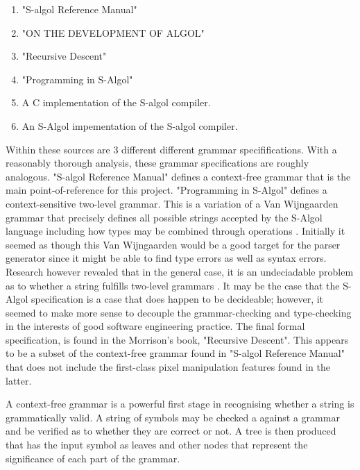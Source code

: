 \documentclass{article}
\begin{document}
\begin{enumerate}
\item "S-algol Reference Manual" \cite{TODO}
\item "ON THE DEVELOPMENT OF ALGOL" \cite{TODO}
\item "Recursive Descent" \cite{TODO}
\item "Programming in S-Algol" \cite{TODO}
\item A C implementation of the S-algol compiler. 
\item An S-Algol impementation of the S-algol compiler. 
\end{enumerate}

Within these sources are 3 different different grammar specififications. With a reasonably thorough analysis, these grammar specifications are roughly analogous. "S-algol Reference Manual" defines a context-free grammar that is the main point-of-reference for this project. "Programming in S-Algol" defines a context-sensitive two-level grammar. This is a variation of a Van Wijngaarden grammar that precisely defines all possible strings accepted by the S-Algol language including how types may be combined through operations \cite{TODO}. Initially it seemed as though this Van Wijngaarden would be a good target for the parser generator since it might be able to find type errors as well as syntax errors. Research however revealed that in the general case, it is an undeciadable problem as to whether a string fulfills two-level grammars \cite{TODO}. It may be the case that the S-Algol specification is a case that does happen to be decideable; however, it seemed to make more sense to decouple the grammar-checking and type-checking in the interests of good software engineering practice. The final formal specification, is found in the Morrison's book, "Recursive Descent". This appears to be a subset of the context-free grammar found in "S-algol Reference Manual" that does not include the first-class pixel manipulation features found in the latter.

A context-free grammar is a powerful first stage in recognising whether a string is grammatically valid. A string of symbols may be checked a against a grammar and be verified as to whether they are correct or not. A tree is then produced that has the input symbol as leaves and other nodes that represent the significance of each part of the grammar.
\end{document}
